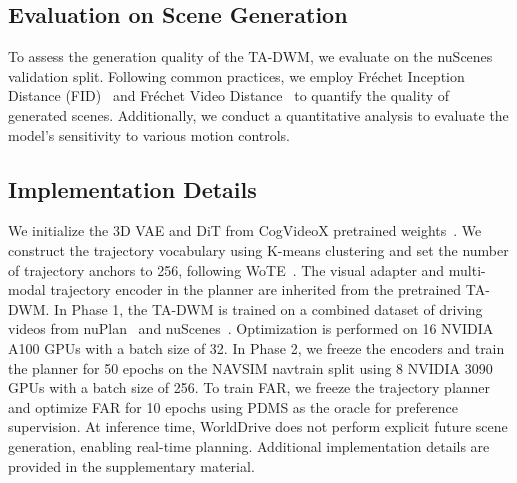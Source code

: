 \subsection{Evaluation on Scene Generation}
To assess the generation quality of the TA-DWM, we evaluate on the nuScenes validation split. Following common practices, we employ Fréchet Inception Distance (FID)~\cite{fid} and Fréchet Video Distance~\cite{fvd} to quantify the quality of generated scenes. Additionally, we conduct a quantitative analysis to evaluate the model's sensitivity to various motion controls.

\subsection{Implementation Details}
We initialize the 3D VAE and DiT from CogVideoX pretrained weights~\cite{cogvideox}. We construct the trajectory vocabulary using K-means clustering and set the number of trajectory anchors to 256, following WoTE~\cite{li2025wote}. The visual adapter and multi-modal trajectory encoder in the planner are inherited from the pretrained TA-DWM. In Phase 1, the TA-DWM is trained on a combined dataset of driving videos from nuPlan~\cite{caesar2021nuplan} and nuScenes~\cite{nuscenes}. Optimization is performed on 16 NVIDIA A100 GPUs with a batch size of 32. In Phase 2, we freeze the encoders and train the planner for 50 epochs on the NAVSIM navtrain split using 8 NVIDIA 3090 GPUs with a batch size of 256. To train FAR, we freeze the trajectory planner and optimize FAR for 10 epochs using PDMS as the oracle for preference supervision. At inference time, WorldDrive does not perform explicit future scene generation, enabling real-time planning. Additional implementation details are provided in the supplementary material.

\begin{table}[!ht]
    \centering
    \setlength{\tabcolsep}{3pt}
\caption{\textbf{Planner with different pretrained representation}. ``VAE Pretrain'' means initializing with the 3D VAE weights from CogVideoX. ``TA-DWM Vision'' and ``TA-DWM Motion'' mean initializing the vision and motion encoders from TA-DWM.}
\label{tab:rep}
\end{table}


